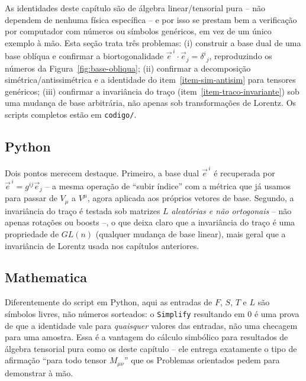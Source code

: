 \documentclass[12pt,a4paper,oneside]{book}
\theoremstyle{rgplain}
\theoremstyle{rgremark}
\begin{document}
As identidades deste capítulo são de álgebra linear/tensorial pura -- não
dependem de nenhuma física específica -- e por isso se prestam bem a
verificação por computador com números ou símbolos genéricos, em vez de um
único exemplo à mão. Esta seção trata três problemas: (i) construir a base
dual de uma base oblíqua e confirmar a biortogonalidade
$\vec e^{\,i}\cdot\vec e_j=\delta^i{}_j$, reproduzindo os números da Figura~\ref{fig:base-obliqua}; (ii)
confirmar a decomposição simétrica/antissimétrica e a identidade do
item~\ref{item-sim-antisim} para tensores genéricos; (iii) confirmar a
invariância do traço (item~\ref{item-traco-invariante}) sob uma mudança de
base arbitrária, não apenas sob transformações de Lorentz. Os scripts
completos estão em \texttt{codigo/}.

\subsection{Python}


Dois pontos merecem destaque. Primeiro, a base dual $\vec e^{\,i}$ é
recuperada por $\vec e^{\,i}=g^{ij}\vec e_j$ -- a mesma operação de ``subir índice'' com a métrica que já
usamos para passar de $V_\mu$ a $V^\mu$, agora aplicada aos próprios vetores
de base. Segundo, a invariância do traço é testada sob matrizes $L$
\emph{aleatórias e não ortogonais} -- não apenas rotações ou boosts --, o
que deixa claro que a invariância do traço é uma propriedade de
$GL(n)$ (qualquer mudança de base linear), mais geral que a invariância de
Lorentz usada nos capítulos anteriores.

\subsection{Mathematica}


Diferentemente do script em Python, aqui as entradas de $F$, $S$, $T$ e $L$
são símbolos livres, não números sorteados: o \texttt{Simplify} resultando
em $0$ é uma prova de que a identidade vale para \emph{quaisquer} valores
das entradas, não uma checagem para uma amostra. Essa é a vantagem do
cálculo simbólico para resultados de álgebra tensorial pura como os deste
capítulo -- ele entrega exatamente o tipo de afirmação ``para todo tensor
$M_{\mu\nu}$'' que os Problemas orientados pedem para demonstrar à mão.
\end{document}
